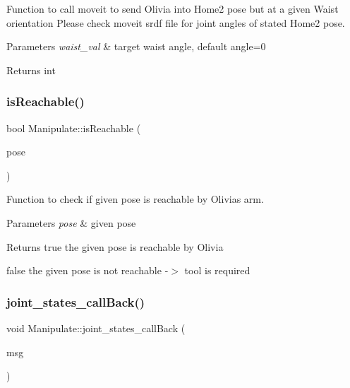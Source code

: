 Function to call moveit to send Olivia into \textquotesingle{}Home2\textquotesingle{} pose but at a given Waist orientation Please check moveit srdf file for joint angles of stated \textquotesingle{}Home2\textquotesingle{} pose. 


\begin{DoxyParams}{Parameters}
{\em waist\+\_\+val} & target waist angle, default angle=0 \\
\hline
\end{DoxyParams}
\begin{DoxyReturn}{Returns}
int 
\end{DoxyReturn}
\mbox{\label{structManipulate_a5aaebe2cacce6f5bb4c28385ed4b85df}} 
\subsubsection{\texorpdfstring{is\+Reachable()}{isReachable()}}
{\footnotesize\ttfamily bool Manipulate\+::is\+Reachable (\begin{DoxyParamCaption}\item[{geometry\+\_\+msgs\+::\+Pose}]{pose }\end{DoxyParamCaption})\hspace{0.3cm}{\ttfamily [private]}}



Function to check if given pose is reachable by Olivia\textquotesingle{}s arm. 


\begin{DoxyParams}{Parameters}
{\em pose} & given pose \\
\hline
\end{DoxyParams}
\begin{DoxyReturn}{Returns}
true the given pose is reachable by Olivia 

false the given pose is not reachable -\/$>$ tool is required 
\end{DoxyReturn}
\mbox{\label{structManipulate_a197a10328ff64f9452a3b0be22dd8d70}} 
\subsubsection{\texorpdfstring{joint\+\_\+states\+\_\+call\+Back()}{joint\_states\_callBack()}}
{\footnotesize\ttfamily void Manipulate\+::joint\+\_\+states\+\_\+call\+Back (\begin{DoxyParamCaption}\item[{const sensor\+\_\+msgs\+::\+Joint\+State\+::\+Ptr \&}]{msg }\end{DoxyParamCaption})\hspace{0.3cm}{\ttfamily [private]}}



